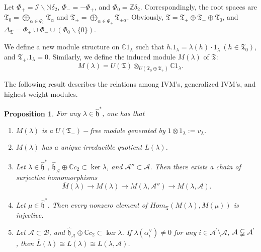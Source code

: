 \documentclass[11pt]{amsproc}
\newtheorem{proposition}{Proposition}[section]
\theoremstyle{definition}
\theoremstyle{remark}
\numberwithin{equation}{section} \errorcontextlines=0
\begin{document}
Let $\Phi_+=\mathcal {I}\backslash {\mathbb{N}\delta_{2}}$,
$\Phi_-=-\Phi_+$, and $\Phi_0=\mathbb{Z}\delta_2$.
Correspondingly, the root spaces are
$\mathfrak T_0=\bigoplus_{\alpha\in\Phi_0}\mathfrak T_{\alpha}$
and $\mathfrak T_{\pm}=\bigoplus_{\alpha\in\Phi_{+}}
\mathfrak T_{\pm\alpha}$. Obviously,
$\mathfrak T=\mathfrak T_+\oplus\mathfrak T_-\oplus\mathfrak T_0$,
and $
\Delta_{\mathfrak T}=\Phi_+\cup\Phi_-\cup(\Phi_0\backslash\{0\})$.

We define a new module structure on
$\mathbb C1_{\lambda}$ such that
$h.1_{\lambda}=\lambda(h)\cdot1_{\lambda}~(h\in\mathfrak T_0)$,
and $\mathfrak T_{+}.1_{\lambda}=0$. Similarly, we define
the induced module $M(\lambda)$ of $\mathfrak T$:
$$ M(\lambda)=U(\mathfrak T)\otimes_{U(\mathfrak T_0\oplus\mathfrak T_{+})}\mathbb C1_{\lambda}.$$

The following result describes the relations among IVM's, generalized IVM's, and highest weight modules.

\begin{proposition} For any ${\lambda}\in\hat{\mathfrak h}^*$, one has that
\begin{enumerate}
\item  $M(\lambda)$ is a $U(\mathfrak T_-)-$free module generated
by $1\otimes1_{\lambda}:=v_{\lambda}$.

\item $M(\lambda)$ has a unique
irreducible quotient $L(\lambda)$.

\item Let $\lambda\in\hat{\mathfrak h}^{\ast}$, $\hat{\mathfrak h}_{\mathcal
{A}}\oplus\mathbb{C}c_2\subset \ker\lambda$, and $\mathcal
A''\subset \mathcal {A}$. Then there exists a chain of
surjective homomorphisms
$$\overline{M}(\lambda)\rightarrow M(\lambda)\rightarrow M(\lambda,\mathcal A'')\rightarrow M(\lambda,\mathcal {A}).$$

\item Let $\mu\in\hat{\mathfrak h}^{\ast}$. Then every nonzero
element of $Hom_{\mathfrak T}(M(\lambda),M(\mu))$ is injective.

\item Let $\mathcal {A}\subset
\mathcal {B}$, and $\hat{\mathfrak h}_{\mathcal
{A}}\oplus\mathbb{C}c_2\subset \ker\lambda$. If
$\lambda(\alpha_i^{\vee})\neq 0$ for any $i\in \mathcal
{A}^{'}\setminus \mathcal {A}$, $\mathcal {A}\varsubsetneqq\mathcal
{A}^{'}$, then $\overline{L}(\lambda)\cong L(\lambda)\cong
L(\lambda,\mathcal {A})$.
\end{enumerate}
\end{proposition}
\end{document}
